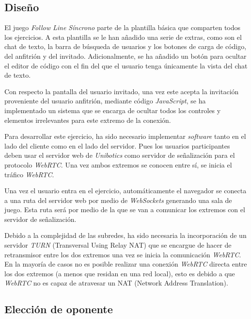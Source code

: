 \documentclass[a4paper, 12pt]{book}
\begin{document}
\subsection{Diseño}

El juego \emph{Follow Line Síncrono} parte de la plantilla básica que comparten todos los ejercicios. A esta plantilla se le han añadido una serie de extras, como son el chat de texto, la barra de búsqueda de usuarios y los botones de carga de código, del anfitrión y del invitado. Adicionalmente, se ha añadido un botón para ocultar el editor de código con el fin del que el usuario tenga únicamente la vista del chat de texto.

Con respecto la pantalla del usuario invitado, una vez este acepta la invitación proveniente del usuario anfitrión, mediante código \emph{JavaScript}, se ha implementado un sistema que se encarga de ocultar todos los controles y elementos irrelevantes para este extremo de la conexión.

Para desarrollar este ejercicio, ha sido necesario implementar \emph{software} tanto en el lado del cliente como en el lado del servidor. Pues los usuarios participantes deben usar el servidor web de \emph{Unibotics} como servidor de señalización para el protocolo \emph{WebRTC}. Una vez ambos extremos se conocen entre sí, se inicia el tráfico \emph{WebRTC}.

Una vez el usuario entra en el ejercicio, automáticamente el navegador se conecta a una ruta del servidor web por medio de \emph{WebSockets} generando una sala de juego. Esta ruta será por medio de la que se van a comunicar los extremos con el servidor de señalización.

Debido a la complejidad de las subredes, ha sido necesaria la incorporación de un servidor \emph{TURN} (Transversal Using Relay NAT) que se encargue de hacer de retransmisor entre los dos extremos una vez se inicia la comunicación \emph{WebRTC}. En la mayoría de casos no es posible realizar una conexión \emph{WebRTC} directa entre los dos extremos (a menos que residan en una red local), esto es debido a que \emph{WebRTC} no es capaz de atravesar un NAT (Network Address Translation).

\subsection{Elección de oponente}
\label{sec:follow_line_game_sync_oponente_chat}
\end{document}

